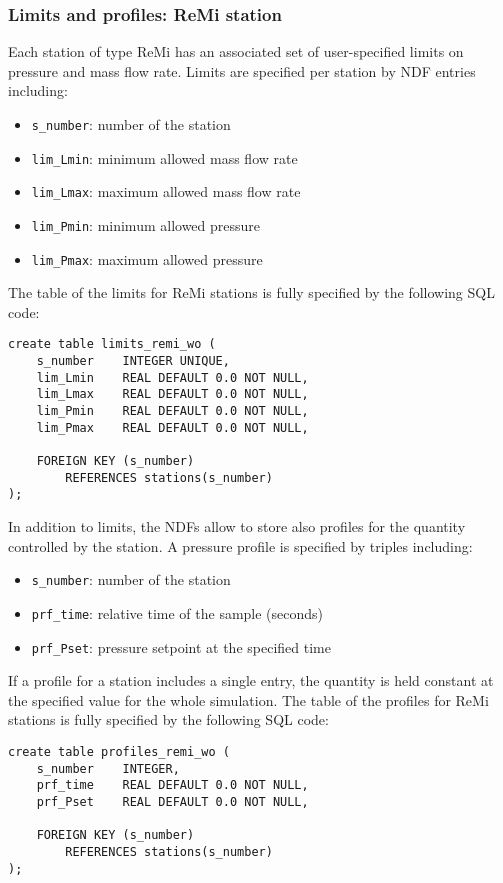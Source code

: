 \documentclass[10pt]{article}
\begin{document}
\subsubsection{Limits and profiles: ReMi station}
Each station of type ReMi has an associated set of user-specified limits on pressure
and mass flow rate. Limits are specified per station by NDF entries including:
\begin{itemize}
    \item \texttt{s\_number}:   number of the station
    \item \texttt{lim\_Lmin}:   minimum allowed mass flow rate
    \item \texttt{lim\_Lmax}:   maximum allowed mass flow rate
    \item \texttt{lim\_Pmin}:   minimum allowed pressure
    \item \texttt{lim\_Pmax}:   maximum allowed pressure
\end{itemize}
The table of the limits for ReMi stations is fully specified by the following SQL code:
\begin{verbatim}
create table limits_remi_wo (
    s_number    INTEGER UNIQUE,
    lim_Lmin    REAL DEFAULT 0.0 NOT NULL,
    lim_Lmax    REAL DEFAULT 0.0 NOT NULL,
    lim_Pmin    REAL DEFAULT 0.0 NOT NULL,
    lim_Pmax    REAL DEFAULT 0.0 NOT NULL,

    FOREIGN KEY (s_number)
        REFERENCES stations(s_number)
);
\end{verbatim}
In addition to limits, the NDFs allow to store also profiles for the quantity
controlled by the station. A pressure profile is specified by triples including:
\begin{itemize}
    \item \texttt{s\_number}:   number of the station
    \item \texttt{prf\_time}:   relative time of the sample (seconds)
    \item \texttt{prf\_Pset}:   pressure setpoint at the specified time
\end{itemize}
If a profile for a station includes a single entry, the quantity is held constant
at the specified value for the whole simulation. The table of the profiles for
ReMi stations is fully specified by the following SQL code:
\begin{verbatim}
create table profiles_remi_wo (
    s_number    INTEGER,
    prf_time    REAL DEFAULT 0.0 NOT NULL,
    prf_Pset    REAL DEFAULT 0.0 NOT NULL,

    FOREIGN KEY (s_number)
        REFERENCES stations(s_number)
);
\end{verbatim}
\end{document}

